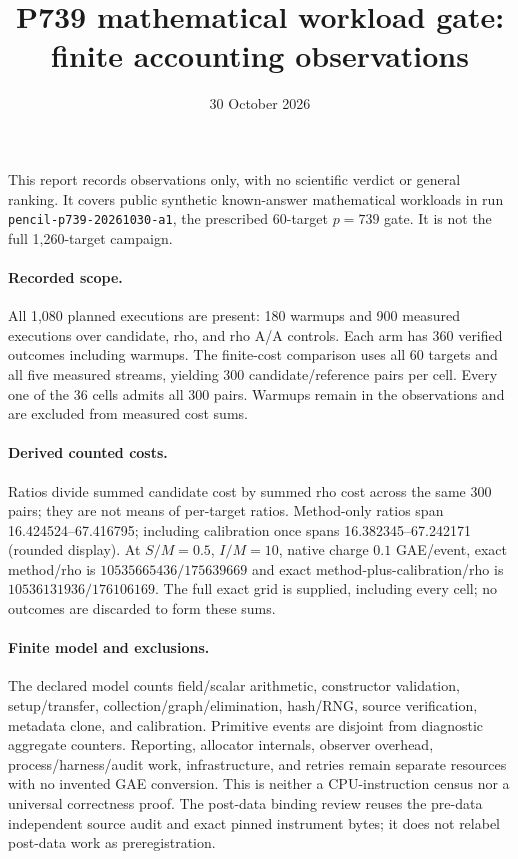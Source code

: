 \documentclass[10pt]{article}
\begin{document}
\title{P739 mathematical workload gate: finite accounting observations}\date{30 October 2026}\maketitle
This report records observations only, with no scientific verdict or general ranking. It covers public synthetic known-answer mathematical workloads in run \texttt{pencil-p739-20261030-a1}, the prescribed 60-target $p=739$ gate. It is not the full 1,260-target campaign.

\paragraph{Recorded scope.} All 1,080 planned executions are present: 180 warmups and 900 measured executions over candidate, rho, and rho A/A controls. Each arm has 360 verified outcomes including warmups. The finite-cost comparison uses all 60 targets and all five measured streams, yielding 300 candidate/reference pairs per cell. Every one of the 36 cells admits all 300 pairs. Warmups remain in the observations and are excluded from measured cost sums.

\paragraph{Derived counted costs.} Ratios divide summed candidate cost by summed rho cost across the same 300 pairs; they are not means of per-target ratios. Method-only ratios span 16.424524--67.416795; including calibration once spans 16.382345--67.242171 (rounded display). At $S/M=0.5$, $I/M=10$, native charge $0.1$ GAE/event, exact method/rho is $10535665436/175639669$ and exact method-plus-calibration/rho is $10536131936/176106169$. The full exact grid is supplied, including every cell; no outcomes are discarded to form these sums.

\paragraph{Finite model and exclusions.} The declared model counts field/scalar arithmetic, constructor validation, setup/transfer, collection/graph/elimination, hash/RNG, source verification, metadata clone, and calibration. Primitive events are disjoint from diagnostic aggregate counters. Reporting, allocator internals, observer overhead, process/harness/audit work, infrastructure, and retries remain separate resources with no invented GAE conversion. This is neither a CPU-instruction census nor a universal correctness proof. The post-data binding review reuses the pre-data independent source audit and exact pinned instrument bytes; it does not relabel post-data work as preregistration.
\end{document}
